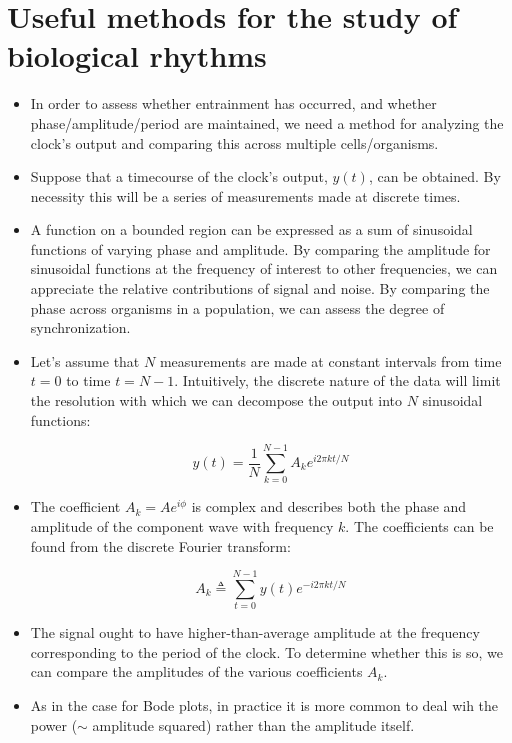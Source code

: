 \documentclass{article}
\begin{document}
\section*{Useful methods for the study of biological rhythms}

\begin{itemize}
\item In order to assess whether entrainment has occurred, and whether phase/amplitude/period are maintained, we need a method for analyzing the clock's output and comparing this across multiple cells/organisms.
\item Suppose that a timecourse of the clock's output, $y(t)$, can be obtained. By necessity this will be a series of measurements made at discrete times.

\item A function on a bounded region can be expressed as a sum of sinusoidal functions of varying phase and amplitude. By comparing the amplitude for sinusoidal functions at the frequency of interest to other frequencies, we can appreciate the relative contributions of signal and noise. By comparing the phase across organisms in a population, we can assess the degree of synchronization.

\item Let's assume that $N$ measurements are made at constant intervals from time $t=0$ to time $t=N-1$. Intuitively, the discrete nature of the data will limit the resolution with which we can decompose the output into $N$ sinusoidal functions:

\[ y(t) = \frac{1}{N} \sum_{k=0}^{N-1} A_{k} e^{i 2 \pi k t/N}  \]

\item The coefficient $A_{k}=Ae^{i\phi}$ is complex and describes both the phase and amplitude of the component wave with frequency $k$. The coefficients can be found from the discrete Fourier transform:

\[ A_k \triangleq \sum_{t=0}^{N-1} y(t) e^{-i 2 \pi k  t/N}  \]

\item The signal ought to have higher-than-average amplitude at the frequency corresponding to the period of the clock. To determine whether this is so, we can compare the amplitudes of the various coefficients $A_k$.

\item As in the case for Bode plots, in practice it is more common to deal wih the power ($\sim$ amplitude squared) rather than the amplitude itself.


\end{itemize}
\end{document}
